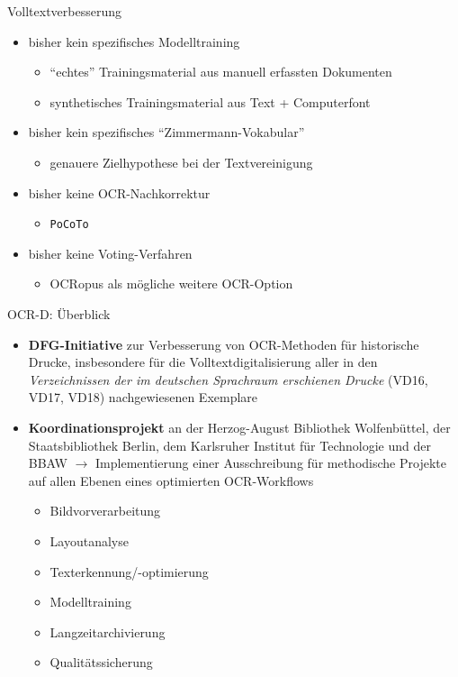 \documentclass{bbawslides}
\begin{document}
\begin{bbawslide}{Volltextverbesserung}
  \vspace*{7mm}%
  \centerslidestrue%
  \begin{itemize}
    \item bisher kein spezifisches Modelltraining
    \begin{itemize}\small
      \item \enquote{echtes} Trainingsmaterial aus manuell erfassten Dokumenten
      \item synthetisches Trainingsmaterial aus Text + Computerfont
    \end{itemize}
    \item bisher kein spezifisches \enquote{Zimmermann-Vokabular}
    \begin{itemize}\small
      \item genauere Zielhypothese bei der Textvereinigung
    \end{itemize}
    \item bisher keine OCR-Nachkorrektur
    \begin{itemize}\small
      \item \texttt{PoCoTo} 
    \end{itemize}
    \item bisher keine Voting-Verfahren
    \begin{itemize}\small
      \item OCRopus als mögliche weitere OCR-Option 
    \end{itemize}
  \end{itemize}
\end{bbawslide}

\begin{bbawslide}{OCR-D: Überblick}
  \vspace*{2mm}%
  \centerslidestrue%
  \begin{itemize}
    \item \textbf{DFG-Initiative} zur Verbesserung von OCR-Methoden für historische Drucke, insbesondere
          für die Volltextdigitalisierung aller in den \emph{Verzeichnissen der im deutschen
          Sprachraum erschienen Drucke} (VD16, VD17, VD18) nachgewiesenen Exemplare
    \item \textbf{Koordinationsprojekt} an der Herzog-August Bibliothek Wolfenbüttel, der Staatsbibliothek
          Berlin, dem Karlsruher Institut für Technologie und der BBAW $\rightarrow$ Implementierung
          einer Ausschreibung für methodische
          Projekte auf allen Ebenen eines optimierten OCR-Workflows
    \begin{itemize}\small
      \item Bildvorverarbeitung
      \item Layoutanalyse
      \item Texterkennung/-optimierung
      \item Modelltraining
      \item Langzeitarchivierung
      \item Qualitätssicherung
    \end{itemize}
  \end{itemize}
\end{bbawslide}
\end{document}
